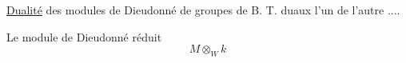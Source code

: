 \uline{Dualité} des modules de Dieudonné de groupes de B. T. duaux l'un de l'autre ....

Le module de Dieudonné réduit
\[
M\otimes_W k
\]
